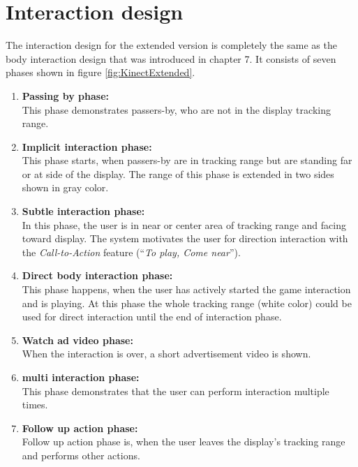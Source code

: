 \section{Interaction design}
The interaction design for the extended version is completely the same as the body interaction design that was introduced in chapter 7. It consists of seven phases shown in figure \ref{fig:KinectExtended}.

\begin{enumerate}
\item \textbf{Passing by phase:} \\
This phase demonstrates passers-by, who are not in the display tracking range.

\item \textbf{Implicit interaction phase:} \\
This phase starts, when passers-by are in tracking range but are standing far or at side of the display. The range of this phase is extended in two sides shown in gray color.

\item \textbf{Subtle interaction phase:} \\
In this phase, the user is in near or center area of tracking range and facing toward display. The system motivates the user for direction interaction with the \emph{Call-to-Action} feature (``\emph{To play, Come near}'').

\item \textbf{Direct body interaction phase:} \\
This phase happens, when the user has actively started the game interaction and is playing. At this phase the whole tracking range (white color) could be used for direct interaction until the end of interaction phase.

\item \textbf{Watch ad video phase:} \\
When the interaction is over, a short advertisement video is shown.

\item \textbf{multi interaction phase:} \\
This phase demonstrates that the user can perform interaction multiple times.

\item \textbf{Follow up action phase:} \\
Follow up action phase is, when the user leaves the display’s tracking range and performs other actions.
\end{enumerate}


